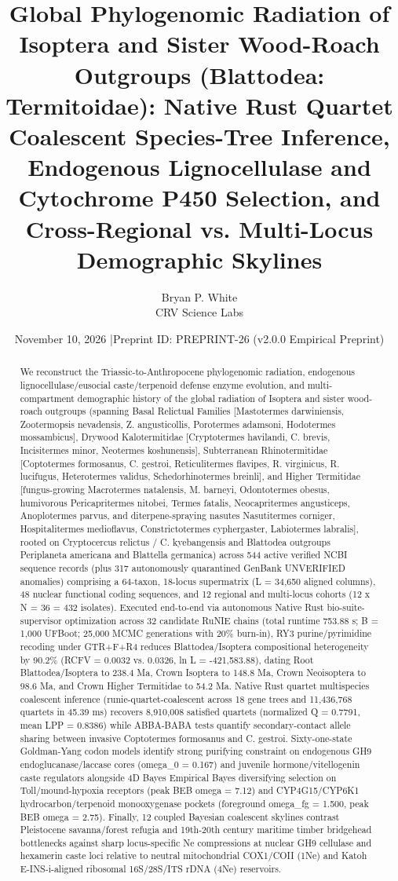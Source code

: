 \documentclass[10pt,letterpaper]{article}
\title{Global Phylogenomic Radiation of Isoptera and Sister Wood-Roach Outgroups (Blattodea: Termitoidae): Native Rust Quartet Coalescent Species-Tree Inference, Endogenous Lignocellulase and Cytochrome P450 Selection, and Cross-Regional vs. Multi-Locus Demographic Skylines}
\author{Bryan P. White \\ CRV Science Labs}
\date{November 10, 2026 \quad|\quad Preprint ID: PREPRINT-26 (v2.0.0 Empirical Preprint)}
\begin{document}
\maketitle
\begin{abstract}
We reconstruct the Triassic-to-Anthropocene phylogenomic radiation, endogenous lignocellulase/eusocial caste/terpenoid defense enzyme evolution, and multi-compartment demographic history of the global radiation of Isoptera and sister wood-roach outgroups (spanning Basal Relictual Families [Mastotermes darwiniensis, Zootermopsis nevadensis, Z. angusticollis, Porotermes adamsoni, Hodotermes mossambicus], Drywood Kalotermitidae [Cryptotermes havilandi, C. brevis, Incisitermes minor, Neotermes koshunensis], Subterranean Rhinotermitidae [Coptotermes formosanus, C. gestroi, Reticulitermes flavipes, R. virginicus, R. lucifugus, Heterotermes validus, Schedorhinotermes breinli], and Higher Termitidae [fungus-growing Macrotermes natalensis, M. barneyi, Odontotermes obesus, humivorous Pericapritermes nitobei, Termes fatalis, Neocapritermes angusticeps, Anoplotermes parvus, and diterpene-spraying nasutes Nasutitermes corniger, Hospitalitermes medioflavus, Constrictotermes cyphergaster, Labiotermes labralis], rooted on Cryptocercus relictus / C. kyebangensis and Blattodea outgroups Periplaneta americana and Blattella germanica) across 544 active verified NCBI sequence records (plus 317 autonomously quarantined GenBank UNVERIFIED anomalies) comprising a 64-taxon, 18-locus supermatrix (L = 34,650 aligned columns), 48 nuclear functional coding sequences, and 12 regional and multi-locus cohorts (12 x N = 36 = 432 isolates). Executed end-to-end via autonomous Native Rust bio-suite-supervisor optimization across 32 candidate RuNIE chains (total runtime 753.88 s; B = 1,000 UFBoot; 25,000 MCMC generations with 20\% burn-in), RY3 purine/pyrimidine recoding under GTR+F+R4 reduces Blattodea/Isoptera compositional heterogeneity by 90.2\% (RCFV = 0.0032 vs. 0.0326, ln L = -421,583.88), dating Root Blattodea/Isoptera to 238.4 Ma, Crown Isoptera to 148.8 Ma, Crown Neoisoptera to 98.6 Ma, and Crown Higher Termitidae to 54.2 Ma. Native Rust quartet multispecies coalescent inference (runie-quartet-coalescent across 18 gene trees and 11,436,768 quartets in 45.39 ms) recovers 8,910,008 satisfied quartets (normalized Q = 0.7791, mean LPP = 0.8386) while ABBA-BABA tests quantify secondary-contact allele sharing between invasive Coptotermes formosanus and C. gestroi. Sixty-one-state Goldman-Yang codon models identify strong purifying constraint on endogenous GH9 endoglucanase/laccase cores (omega\_0 = 0.167) and juvenile hormone/vitellogenin caste regulators alongside 4D Bayes Empirical Bayes diversifying selection on Toll/mound-hypoxia receptors (peak BEB omega = 7.12) and CYP4G15/CYP6K1 hydrocarbon/terpenoid monooxygenase pockets (foreground omega\_fg = 1.500, peak BEB omega = 2.75). Finally, 12 coupled Bayesian coalescent skylines contrast Pleistocene savanna/forest refugia and 19th-20th century maritime timber bridgehead bottlenecks against sharp locus-specific Ne compressions at nuclear GH9 cellulase and hexamerin caste loci relative to neutral mitochondrial COX1/COII (1Ne) and Katoh E-INS-i-aligned ribosomal 16S/28S/ITS rDNA (4Ne) reservoirs.
\end{abstract}
\end{document}

